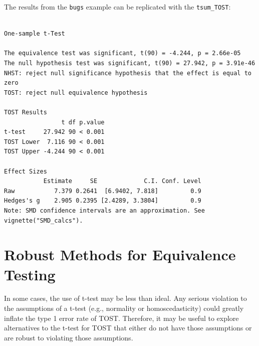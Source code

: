 \documentclass[
]{interact}
\newenvironment{Shaded}{\begin{snugshade}}{\end{snugshade}}
\newcommand{\AttributeTok}[1]{\textcolor[rgb]{0.40,0.45,0.13}{#1}}
\newcommand{\ConstantTok}[1]{\textcolor[rgb]{0.56,0.35,0.01}{#1}}
\newcommand{\FloatTok}[1]{\textcolor[rgb]{0.68,0.00,0.00}{#1}}
\newcommand{\FunctionTok}[1]{\textcolor[rgb]{0.28,0.35,0.67}{#1}}
\newcommand{\NormalTok}[1]{\textcolor[rgb]{0.00,0.23,0.31}{#1}}
\newcommand{\OtherTok}[1]{\textcolor[rgb]{0.00,0.23,0.31}{#1}}
\newcommand{\SpecialCharTok}[1]{\textcolor[rgb]{0.37,0.37,0.37}{#1}}
\newcommand{\StringTok}[1]{\textcolor[rgb]{0.13,0.47,0.30}{#1}}
\begin{document}
The results from the \texttt{bugs} example can be replicated with the
\texttt{tsum\_TOST}:

\begin{Shaded}
\end{Shaded}

\begin{verbatim}

One-sample t-Test

The equivalence test was significant, t(90) = -4.244, p = 2.66e-05
The null hypothesis test was significant, t(90) = 27.942, p = 3.91e-46
NHST: reject null significance hypothesis that the effect is equal to zero 
TOST: reject null equivalence hypothesis

TOST Results 
                t df p.value
t-test     27.942 90 < 0.001
TOST Lower  7.116 90 < 0.001
TOST Upper -4.244 90 < 0.001

Effect Sizes 
           Estimate     SE             C.I. Conf. Level
Raw           7.379 0.2641  [6.9402, 7.818]         0.9
Hedges's g    2.905 0.2395 [2.4289, 3.3804]         0.9
Note: SMD confidence intervals are an approximation. See vignette("SMD_calcs").
\end{verbatim}

\newpage

\hypertarget{robust-methods-for-equivalence-testing}{%
\section{Robust Methods for Equivalence
Testing}\label{robust-methods-for-equivalence-testing}}

In some cases, the use of t-test may be less than ideal. Any serious
violation to the assumptions of a t-test (e.g., normality or
homoscedasticity) could greatly inflate the type 1 error rate of TOST.
Therefore, it may be useful to explore alternatives to the t-test for
TOST that either do not have those assumptions or are robust to
violating those assumptions.
\end{document}
